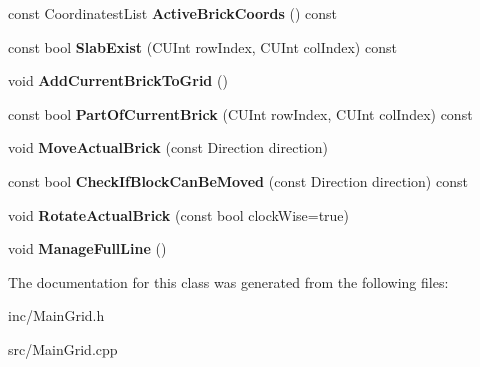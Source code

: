 \begin{DoxyCompactItemize}
\item 
\hypertarget{classCMainGrid_a9885b198b38754f6a4f146da94b9583a}{const Coordinatest\-List {\bfseries Active\-Brick\-Coords} () const }\label{classCMainGrid_a9885b198b38754f6a4f146da94b9583a}

\item 
\hypertarget{classCMainGrid_a5989913dc3f69847b0487451228b3cf5}{const bool {\bfseries Slab\-Exist} (C\-U\-Int row\-Index, C\-U\-Int col\-Index) const }\label{classCMainGrid_a5989913dc3f69847b0487451228b3cf5}

\item 
\hypertarget{classCMainGrid_afedebf8cf7d6a059099d4570987027c8}{void {\bfseries Add\-Current\-Brick\-To\-Grid} ()}\label{classCMainGrid_afedebf8cf7d6a059099d4570987027c8}

\item 
\hypertarget{classCMainGrid_a4f7434247ade2231d257bc1c2860c96b}{const bool {\bfseries Part\-Of\-Current\-Brick} (C\-U\-Int row\-Index, C\-U\-Int col\-Index) const }\label{classCMainGrid_a4f7434247ade2231d257bc1c2860c96b}

\item 
\hypertarget{classCMainGrid_a16a1a3cde9ab2d8a4c2e3b367cf94034}{void {\bfseries Move\-Actual\-Brick} (const Direction direction)}\label{classCMainGrid_a16a1a3cde9ab2d8a4c2e3b367cf94034}

\item 
\hypertarget{classCMainGrid_af001df3b52aa8aa7091b59d15e2997ed}{const bool {\bfseries Check\-If\-Block\-Can\-Be\-Moved} (const Direction direction) const }\label{classCMainGrid_af001df3b52aa8aa7091b59d15e2997ed}

\item 
\hypertarget{classCMainGrid_ae77015d339f635b53921a74f2c8d42c4}{void {\bfseries Rotate\-Actual\-Brick} (const bool clock\-Wise=true)}\label{classCMainGrid_ae77015d339f635b53921a74f2c8d42c4}

\item 
\hypertarget{classCMainGrid_ab086114dfb0e40a4debd1205749347ab}{void {\bfseries Manage\-Full\-Line} ()}\label{classCMainGrid_ab086114dfb0e40a4debd1205749347ab}

\end{DoxyCompactItemize}


The documentation for this class was generated from the following files\-:\begin{DoxyCompactItemize}
\item 
inc/Main\-Grid.\-h\item 
src/Main\-Grid.\-cpp\end{DoxyCompactItemize}
